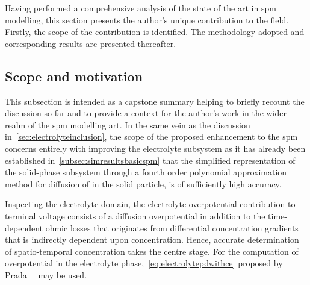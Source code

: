 
Having performed a  comprehensive analysis of the state of  the art in \gls{spm}
modelling, this section presents the  author's unique contribution to the field.
Firstly, the  scope of the  contribution is identified. The  methodology adopted
and corresponding results are presented thereafter.

\subsection{Scope and motivation}\label{subsec:scopenewelectrolyte}

This subsection is intended as a capstone summary helping to briefly recount the
discussion so far  and to provide a  context for the author's work  in the wider
realm  of the  \gls{spm}  modelling art.  In  the same  vein  as the  discussion
in~\cref{sec:electrolyteinclusion}, the scope of the proposed enhancement to the
\gls{spm} concerns entirely  with improving the electrolyte subsystem  as it has
already been established in~\cref{subsec:simresultsbasicspm} that the simplified
representation of  the solid-phase subsystem  through a fourth  order polynomial
approximation method  for diffusion of   in  the solid particle,  is of
sufficiently high accuracy.

Inspecting the  electrolyte domain,  the electrolyte  overpotential contribution
to  terminal  voltage   consists  of  a  diffusion   overpotential  in  addition
to   the  time-dependent   ohmic  losses   that  originates   from  differential
concentration  gradients  that  is   indirectly  dependent  upon  concentration.
Hence,  accurate  determination  of   spatio-temporal  concentration  takes  the
centre  stage.  For   the  computation  of  overpotential   in  the  electrolyte
phase,~\cref{eq:electrolytepdwithce}  proposed  by  Prada~\etal~\cite{Prada2012}
may be used.

